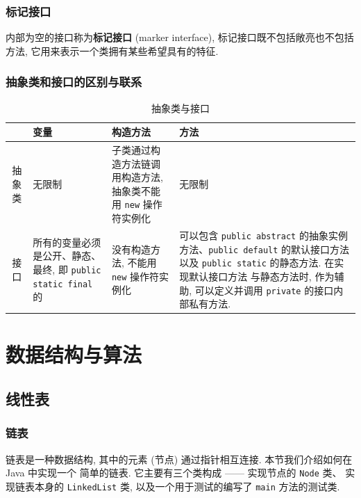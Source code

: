 \documentclass[10pt,UTF8]{book} %
\begin{document}
\section{标记接口}

内部为空的接口称为\textbf{标记接口} (marker interface),
标记接口既不包括敞亮也不包括方法, 它用来表示一个类拥有某些希望具有的特征.

\section{抽象类和接口的区别与联系}

\begin{table}[H]
    \centering
    \caption{抽象类与接口}
    \begin{tabular}{cp{}p{}p{}}
        \hline 
        & \textbf{变量} & \textbf{构造方法} & \textbf{方法} \\
        \hline
        抽象类 & 无限制 & 子类通过构造方法链调用构造方法, 抽象类不能用 \lstinline|new|
        操作符实例化 & 无限制 \\ 
        接口 & 所有的变量必须是公开、静态、最终, 即 \lstinline|public static final| 的 &
        没有构造方法, 不能用 \lstinline|new| 操作符实例化 
        & 可以包含 \lstinline|public abstract| 的抽象实例方法、\lstinline|public default|
        的默认接口方法以及 \lstinline|public static| 的静态方法. 在实现默认接口方法
        与静态方法时, 作为辅助, 可以定义并调用 \lstinline|private| 的接口内部私有方法. \\ 
        \hline
    \end{tabular}
\end{table}

\part{数据结构与算法}

\chapter{线性表}

\section{链表}

链表是一种数据结构, 其中的元素 (节点) 通过指针相互连接. 本节我们介绍如何在 Java 中实现一个
简单的链表. 它主要有三个类构成 —— 实现节点的 \lstinline|Node| 类、
实现链表本身的 \lstinline|LinkedList| 类, 以及一个用于测试的编写了 \lstinline|main| 方法的测试类.
\end{document}
